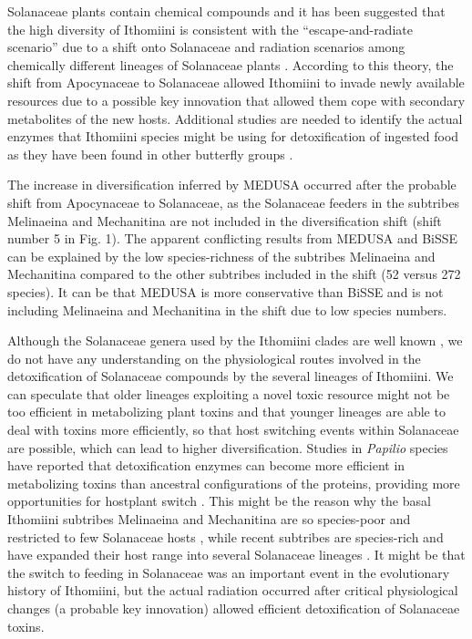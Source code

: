 \documentclass[10pt]{article}
\begin{document}
Solanaceae plants contain chemical compounds and it has been suggested
that the high diversity of Ithomiini is consistent with the
``escape-and-radiate scenario'' due to a shift onto Solanaceae 
\cite{fordyce2010}
and radiation scenarios among chemically different lineages of
Solanaceae plants \cite{willmott2006,brown1987}.
According to this theory, the shift from
Apocynaceae to Solanaceae allowed Ithomiini to invade newly available
resources due to a possible key innovation that allowed them cope with
secondary metabolites of the new hosts. Additional studies are needed to
identify the actual enzymes that Ithomiini species might be using for
detoxification of ingested food as they have been found in other
butterfly groups \cite{wheat2007}.

The increase in diversification inferred by MEDUSA occurred after the
probable shift from Apocynaceae to Solanaceae, as the Solanaceae feeders
in the subtribes Melinaeina and Mechanitina are not included in the
diversification shift (shift number 5 in Fig. 1). The apparent
conflicting results from MEDUSA and BiSSE can be explained by the low
species-richness of the subtribes Melinaeina and Mechanitina compared to
the other subtribes included in the shift (52 versus 272 species). It
can be that MEDUSA is more conservative than BiSSE and is not including
Melinaeina and Mechanitina in the shift due to low species numbers.

Although the Solanaceae genera used by the Ithomiini clades are well
known \cite{willmott2006}, we do not have any understanding on the physiological
routes involved in the detoxification of Solanaceae compounds by the
several lineages of Ithomiini. We can speculate that older lineages
exploiting a novel toxic resource \cite{willmott2006,wahlberg2009}
might not be too efficient
in metabolizing plant toxins and that younger lineages are able to deal
with toxins more efficiently, so that host switching events within
Solanaceae are possible, which can lead to higher diversification.
Studies in \emph{Papilio} species have reported that detoxification
enzymes can become more efficient in metabolizing toxins than ancestral
configurations of the proteins, providing more opportunities for
hostplant switch \cite{li2003}. This might be the reason why the basal
Ithomiini subtribes Melinaeina and Mechanitina are so species-poor and
restricted to few Solanaceae hosts \cite{willmott2006}, while recent subtribes are
species-rich and have expanded their host range into several Solanaceae
lineages \cite{willmott2006}. It might be that the switch to feeding in Solanaceae
was an important event in the evolutionary history of Ithomiini, but the
actual radiation occurred after critical physiological changes (a
probable key innovation) allowed efficient detoxification of Solanaceae
toxins.
\end{document}
